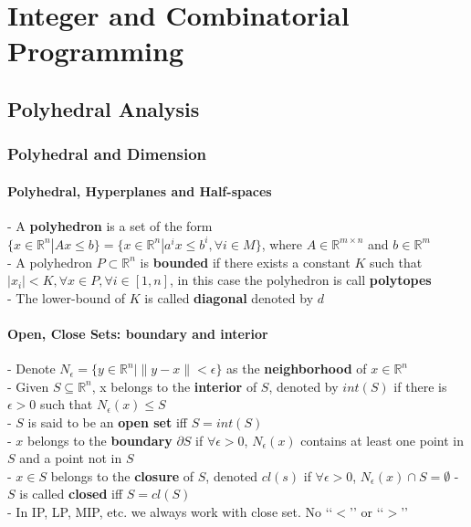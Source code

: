 

\part{Integer and Combinatorial Programming}
	\chapter{Polyhedral Analysis}
		\section{Polyhedral and Dimension}
			\subsection{Polyhedral, Hyperplanes and Half-spaces}
				- A \textbf{polyhedron} is a set of the form $\{x\in \mathbb{R}^n|Ax\le b\}=\{x \in \mathbb{R}^n | a^ix\le b^i, \forall i \in M\}$, where $A \in \mathbb{R}^{m\times n}$ and $b \in \mathbb{R}^m$\\
				- A polyhedron $P \subset \mathbb{R}^n$ is \textbf{bounded} if there exists a constant $K$ such that $|x_i|<K, \forall x \in P, \forall i \in [1, n]$, in this case the polyhedron is call \textbf{polytopes}\\
				- The lower-bound of $K$ is called \textbf{diagonal} denoted by $d$\\

			\subsection{Open, Close Sets: boundary and interior}
				- Denote $N_\epsilon = \{y\in \mathbb{R}^n|\lVert y-x\rVert < \epsilon \}$ as the \textbf{neighborhood} of $x\in \mathbb{R}^n$\\
				- Given $S\subseteq \mathbb{R}^n$, x belongs to the \textbf{interior} of $S$, denoted by $int(S)$ if there is $\epsilon > 0$ such that $N_\epsilon(x) \le S$\\
				- $S$ is said to be an \textbf{open set} iff $S=int(S)$\\
				- $x$ belongs to the \textbf{boundary} $\partial S$ if $\forall \epsilon >0$, $N_\epsilon(x)$ contains at least one point in $S$ and a point not in $S$\\
				- $x\in S$ belongs to the \textbf{closure} of $S$, denoted $cl(s)$ if $\forall \epsilon > 0$, $N_\epsilon(x) \cap S = \emptyset$
				- $S$ is called \textbf{closed} iff $S=cl(S)$\\
				- In IP, LP, MIP, etc. we always work with close set. No \lq\lq{}$<$\rq\rq{} or \lq\lq{}$>$\rq\rq{}

